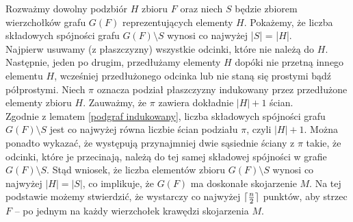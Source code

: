 \documentclass[brudnopis]{xmgr}
\DeclarePairedDelimiter\ceil{\lceil}{\rceil}
\theoremstyle{definition}
\begin{document}
\indent Rozważmy dowolny podzbiór $H$ zbioru $F$ oraz niech $S$ będzie zbiorem wierzchołków grafu $G(F)$ reprezentujących elementy $H$. Pokażemy, że liczba składowych spójności grafu $G(F) \setminus S$ wynosi co najwyżej |$S$| = |$H$|.
\\\indent Najpierw usuwamy (z płaszczyzny) wszystkie odcinki, które nie należą do $H$. Następnie, jeden po drugim, przedłużamy elementy $H$ dopóki nie przetną innego elementu $H$, wcześniej przedłużonego odcinka lub nie staną się prostymi bądź półprostymi. Niech $\pi$ oznacza podział płaszczyzny indukowany przez przedłużone elementy zbioru $H$. Zauważmy, że $\pi$ zawiera dokładnie $|H| + 1$ ścian. 
\\\indent Zgodnie z lematem \ref{podgraf indukowany}, liczba składowych spójności grafu $G(F) \setminus S$ jest co najwyżej równa liczbie ścian podziału $\pi$, czyli $|H| + 1$. Można ponadto wykazać, że występują przynajmniej dwie sąsiednie ściany z $\pi$ takie, że odcinki, które je przecinają, należą do tej samej składowej spójności w grafie $G(F) \setminus S$. Stąd wniosek, że liczba elementów zbioru $G(F) \setminus S$ wynosi co najwyżej $|H| = |S|$, co implikuje, że $G(F)$ ma doskonałe skojarzenie $M$. Na tej podstawie możemy stwierdzić, że wystarczy co najwyżej $\ceil{\frac{n}{2}}$ punktów, aby strzec $F$ -- po jednym na każdy wierzchołek krawędzi skojarzenia $M$.
\end{document}
